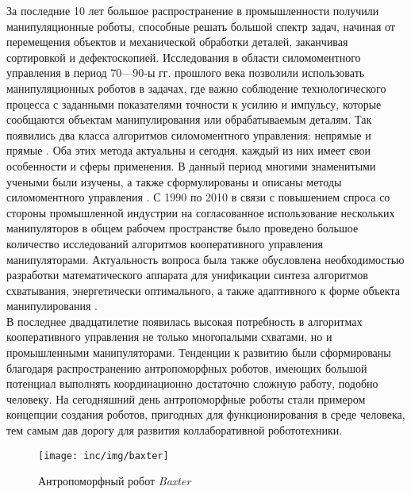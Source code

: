 \Introduction

За последние 10 лет большое распространение в промышленности получили манипуляционные роботы, способные решать большой спектр задач, начиная от перемещения объектов и механической обработки деталей, заканчивая сортировкой и дефектоскопией. Исследования в области силомоментного управления в период 70---90-ы гг. прошлого века позволили использовать манипуляционных роботов в задачах, где важно соблюдение технологического процесса с заданными показателями точности к усилию и импульсу, которые сообщаются объектам манипулирования или обрабатываемым деталям. Так появились два класса алгоритмов силомоментного управления: непрямые и прямые \cite{Handbook}. Оба этих метода актуальны и сегодня, каждый из них имеет свои особенности и сферы применения. В данный период многими знаменитыми учеными были изучены, а также сформулированы и описаны методы силомоментного управления \cite{Khatib1986_force_control, Villani2016, Salisbury1980, Yoshikawa1987, RaibertMH;Craig2015}. С 1990 по 2010 в связи с повышением спроса со стороны промышленной индустрии \cite{Yamada1995, Handbook, Yoshikawa1990} на согласованное использование нескольких манипуляторов в общем рабочем пространстве было проведено большое количество исследований алгоритмов кооперативного управления манипуляторами. Актуальность вопроса была также обусловлена необходимостью разработки математического аппарата для унификации синтеза алгоритмов схватывания, энергетически оптимального, а также адаптивного к форме объекта манипулирования \cite{Takahashi2008,Yoshikawa1991, Park1989}.\\

В последнее двадцатилетие появилась высокая потребность в алгоритмах кооперативного управления не только многопалыми схватами, но и промышленными манипуляторами. Тенденции к развитию были сформированы благодаря распространению антропоморфных роботов, имеющих большой потенциал выполнять координационно достаточно сложную работу, подобно человеку. На сегодняшний день антропоморфные роботы стали примером концепции создания роботов, пригодных для функционирования в среде человека, тем самым дав дорогу для развития коллаборативной робототехники.

\begin{figure}[ht]
  \centering
  \texttt{[image: inc/img/baxter]}
  \caption{Антропоморфный робот \textit{Baxter}}
  \label{fig:baxter}
\end{figure}

